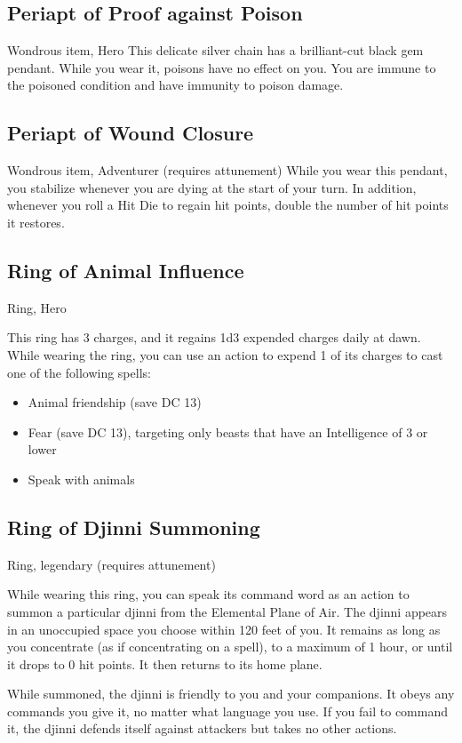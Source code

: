 \subsection{Periapt of Proof against Poison}
Wondrous item, Hero This delicate silver chain has a brilliant-cut black gem pendant. While you wear it, poisons have no effect on you. You are immune to the poisoned condition and have immunity to poison damage.

\subsection{Periapt of Wound Closure}
Wondrous item, Adventurer (requires attunement)
While you wear this pendant, you stabilize whenever you are dying at the start of your turn. In addition, whenever you roll a Hit Die to regain hit points, double the number of hit points it restores.

\subsection{Ring of Animal Influence}
Ring, Hero 

This ring has 3 charges, and it regains 1d3 expended charges daily at dawn. While wearing the ring, you can use an action to expend 1 of its charges to cast one of the following spells:
\begin{itemize}
 \item Animal friendship (save DC 13)
 \item Fear (save DC 13), targeting only beasts that have an Intelligence of 3 or lower
 \item Speak with animals
\end{itemize}

\subsection{Ring of Djinni Summoning}
Ring, legendary (requires attunement)

While wearing this ring, you can speak its command word as an action to summon a particular djinni from the Elemental Plane of Air. The djinni appears in an unoccupied space you choose within 120 feet of you. It remains as long as you concentrate (as if concentrating on a spell), to a maximum of 1 hour, or until it drops to 0 hit points. It then returns to its home plane.

While summoned, the djinni is friendly to you and your companions. It obeys any commands you give it, no matter what language you use. If you fail to command it, the djinni defends itself against attackers but takes no other actions.

